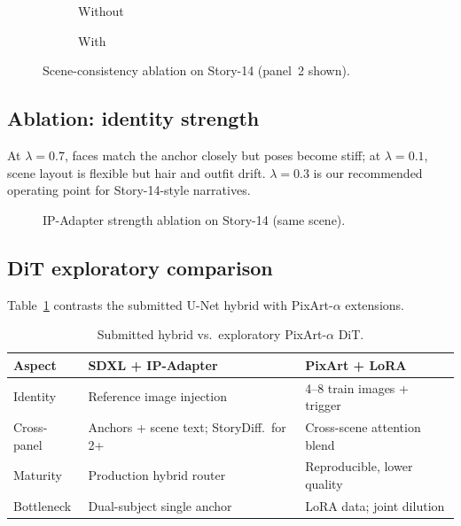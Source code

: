 \begin{figure}[!t]
  \centering
  \begin{subfigure}{0.48\columnwidth}
    \centering
    \caption{Without}
  \end{subfigure}
  \hfill
  \begin{subfigure}{0.48\columnwidth}
    \centering
    \caption{With}
  \end{subfigure}
  \caption{Scene-consistency ablation on Story-14 (panel~2 shown).}
  \label{fig:scene_ablation}
\end{figure}

\subsection{Ablation: identity strength}
At $\lambda=0.7$, faces match the anchor closely but poses become stiff; at $\lambda=0.1$, scene layout is flexible but hair and outfit drift.
$\lambda=0.3$ is our recommended operating point for Story-14-style narratives.

\begin{figure}[!t]
  \centering
  \caption{IP-Adapter strength ablation on Story-14 (same scene).}
  \label{fig:lambda_ablation}
\end{figure}

\subsection{DiT exploratory comparison}
Table~\ref{tab:dit_compare} contrasts the submitted U-Net hybrid with PixArt-$\alpha$ extensions.

\begin{table}[!t]
  \centering
  \small
  \caption{Submitted hybrid vs.\ exploratory PixArt-$\alpha$ DiT.}
  \label{tab:dit_compare}
  \begin{tabular}{p{}p{}p{}}
    \toprule
    \textbf{Aspect} & \textbf{SDXL + IP-Adapter} & \textbf{PixArt + LoRA} \\
    \midrule
    Identity & Reference image injection & 4--8 train images + trigger \\
    Cross-panel & Anchors + scene text; StoryDiff.\ for 2+ & Cross-scene attention blend \\
    Maturity & Production hybrid router & Reproducible, lower quality \\
    Bottleneck & Dual-subject single anchor & LoRA data; joint dilution \\
    \bottomrule
  \end{tabular}
\end{table}

